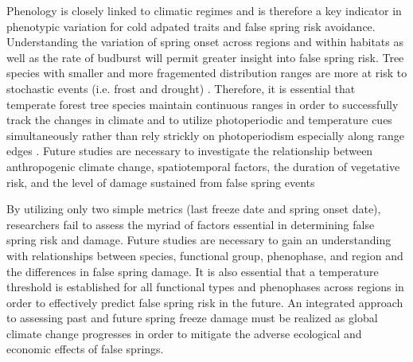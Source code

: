 \documentclass{article}\usepackage[]{graphicx}\usepackage[]{color}
\begin{document}
Phenology is closely linked to climatic regimes \citep{Wolkovich2011} and is therefore a key indicator in phenotypic variation for cold adpated traits and false spring risk avoidance. Understanding the variation of spring onset across regions and within habitats as well as the rate of budburst will permit greater insight into false spring risk. Tree species with smaller and more fragemented distribution ranges are more at risk to stochastic events (i.e. frost and drought) \citep{Alberto2013}. Therefore, it is essential that temperate forest tree species maintain continuous ranges in order to successfully track the changes in climate and to utilize photoperiodic and temperature cues simultaneously rather than rely strickly on photoperiodism especially along range edges \citep{Zohner2016, Gauzere2017}. Future studies are necessary to investigate the relationship between anthropogenic climate change, spatiotemporal factors, the duration of vegetative risk, and the level of damage sustained from false spring events

By utilizing only two simple metrics (last freeze date and spring onset date), researchers fail to assess the myriad of factors essential in determining false spring risk and damage. Future studies are necessary to gain an understanding with relationships between species, functional group, phenophase, and region and the differences in false spring damage. It is also essential that a temperature threshold is established for all functional types and phenophases across regions in order to effectively predict false spring risk in the future. An integrated approach to assessing past and future spring freeze damage must be realized as global climate change progresses in order to mitigate the adverse ecological and economic effects of false springs.


\end{document}
